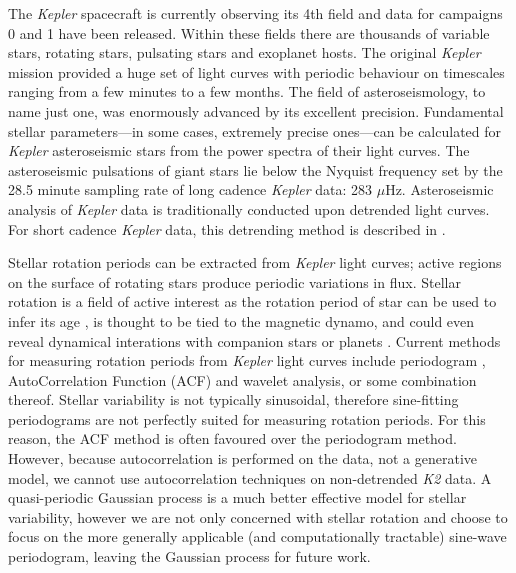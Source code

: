 \documentclass[useAMS, usenatbib]{aastex}
\begin{document}
The {\it Kepler} spacecraft is currently observing its 4th field and data for
campaigns 0 and 1 have been released.
Within these fields there are thousands of variable stars, rotating stars,
pulsating stars and exoplanet hosts.
The original {\it Kepler} mission provided a huge set of light curves with
periodic behaviour on timescales ranging from a few minutes to a few months.
The field of asteroseismology, to name just one, was enormously advanced by
its excellent precision.
Fundamental stellar parameters---in some cases, extremely precise ones---can
be calculated for {\it Kepler} asteroseismic stars from the power spectra of
their light curves.
The asteroseismic pulsations of giant stars lie below the Nyquist frequency set
by the 28.5 minute sampling rate of long cadence {\it Kepler} data:
283 $\mu$Hz.
Asteroseismic analysis of {\it Kepler} data is traditionally conducted upon
detrended light curves.
For short cadence {\it Kepler} data, this detrending method is described in
\citet{Garcia2011}.

Stellar rotation periods can be extracted from {\it Kepler} light curves;
active regions on the surface of rotating stars produce periodic variations
in flux.
Stellar rotation is a field of active interest as the rotation period of star
can be used to infer its age \citep{Skumanich1972, Barnes2007, Epstein2014},
is thought to be tied to the magnetic dynamo, and could even reveal dynamical
interations with companion stars or planets
\citep[e.g.][]{Beky2014, Poppenhaeger2014}.
Current methods for measuring rotation periods from {\it Kepler} light curves
include periodogram \citep[e.g.][]{Reinhold2013}, AutoCorrelation Function
(ACF) \citep{McQuillan2013} and wavelet \citep[e.g.][]{Garcia2014} analysis,
or some combination thereof.
Stellar variability is not typically sinusoidal, therefore sine-fitting
periodograms are not perfectly suited for measuring rotation periods.
For this reason, the ACF method is often favoured over the periodogram method.
However, because autocorrelation is performed on the data, not a generative
model, we cannot use autocorrelation techniques on non-detrended {\it K2} data.
A quasi-periodic Gaussian process is a much better effective model for stellar
variability, however we are not only concerned with stellar rotation and choose
to focus on the more generally applicable (and computationally tractable)
sine-wave periodogram, leaving the Gaussian process for future work.
\end{document}
